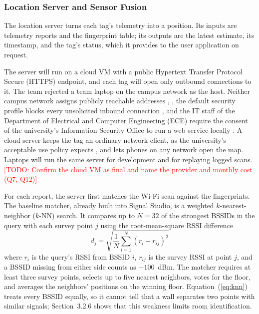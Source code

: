 \documentclass[12pt,letterpaper]{article}
\newcommand{\TODO}[1]{\textcolor{red}{[TODO: #1]}}
\begin{document}
\subsubsection{Location Server and Sensor Fusion}
The location server turns each tag's telemetry into a position. Its inputs are telemetry reports and
the fingerprint table; its outputs are the latest estimate, its timestamp, and the tag's status,
which it provides to the user application on request.

The server will run on a cloud VM with a public Hypertext Transfer Protocol Secure (HTTPS) endpoint,
and each tag will open only outbound connections to it. The team rejected a team laptop on the
campus network as the host. Neither campus network assigns publicly reachable addresses
\cite{utiot}, \cite{utwifi}, the default security profile blocks every unsolicited inbound connection
\cite{utprofiles}, and the IT staff of the Department of Electrical and Computer Engineering (ECE)
require the consent of the university's Information Security Office to run a web service locally
\cite{eceweb}. A cloud server keeps the tag an ordinary network client,
as the university's acceptable use policy expects \cite{utaup}, and lets phones on any network open
the map. Laptops will run the same server for development and for replaying logged scans.
\TODO{Confirm the cloud VM as final and name the provider and monthly cost (Q7, Q12)}

For each report, the server first matches the Wi-Fi scan against the fingerprints. The baseline
matcher, already built into Signal Studio, is a weighted $k$-nearest-neighbor ($k$-NN) search. It
compares up to $N = 32$ of the strongest BSSIDs in the query with each survey point $j$ using the
root-mean-square RSSI difference
\begin{equation}
  d_j = \sqrt{\frac{1}{N} \sum_{i=1}^{N} \left( r_i - r_{ij} \right)^2 }
  \label{eq:knn}
\end{equation}
where $r_i$ is the query's RSSI from BSSID $i$, $r_{ij}$ is the survey RSSI at point $j$, and a BSSID
missing from either side counts as $-100$~dBm. The matcher requires at least three survey points,
selects up to five nearest neighbors, votes for the floor, and averages the neighbors' positions on
the winning floor. Equation~(\ref{eq:knn}) treats every BSSID equally, so it cannot tell that a wall
separates two points with similar signals; Section~3.2.6 shows that this weakness limits room
identification.
\end{document}
